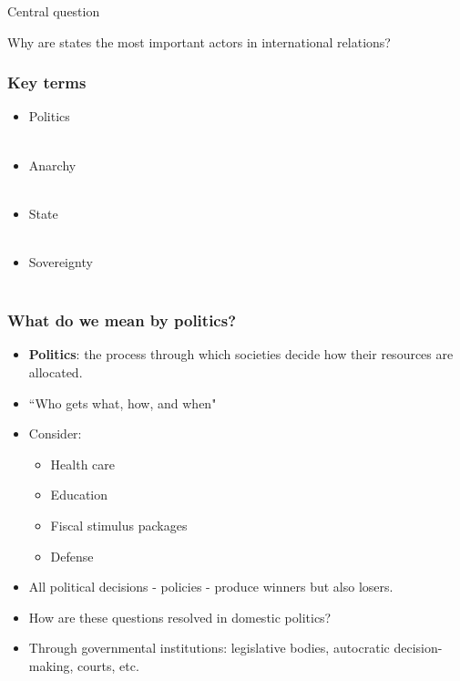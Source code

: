 \documentclass{beamer}
\begin{document}
\begin{frame}{\LARGE Central question}
\begin{center}
\LARGE Why are states the most important actors in international relations?
    \end{center}
\end{frame}

\begin{frame} 
\frametitle{\LARGE{Key terms}}
\begin{itemize}
    \item Politics
   	\\~\\
   	\item Anarchy
   	\\~\\
   	\item State
   	\\~\\
   	\item Sovereignty
   	\\~\\
\end{itemize}
\end{frame}

\begin{frame} 
\frametitle{\LARGE{What do we mean by politics?}}
\begin{itemize}
    \item \textbf{Politics}: the process through which societies decide how their resources are allocated.
    \item ``Who gets what, how, and when" \pause
    \item Consider: \pause
    \begin{itemize}
        \item Health care \pause
        \item Education \pause
        \item Fiscal stimulus packages \pause 
        \item Defense \pause
    \end{itemize}
    \item All political decisions - policies - produce winners but also losers. \pause
    \item How are these questions resolved in domestic politics? \pause
    \item Through governmental institutions: legislative bodies, autocratic decision-making, courts, etc. 
\end{itemize}
\end{frame}
\end{document}

